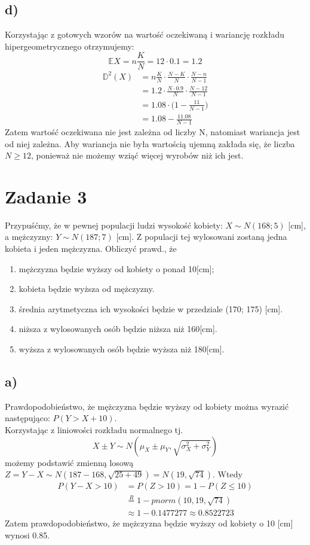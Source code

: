 \documentclass{article}
\begin{document}
\subsection*{d)}
Korzystając z gotowych wzorów na wartość oczekiwaną i wariancję rozkładu hipergeometrycznego otrzymujemy:
\[
\mathbb{E}X = n\frac{K}{N} = 12\cdot0.1 = 1.2
\]
\begin{align*}
\mathbb{D}^2(X) & = n\frac{K}{N} \cdot \frac{N-K}{N} \cdot \frac{N-n}{N-1} \\
& = 1.2\cdot \frac{N\cdot0.9}{N} \cdot \frac{N-12}{N-1} \\
& = 1.08 \cdot \Big( 1 -\frac{11}{N-1}\Big) \\
& = 1.08 -\frac{11.08}{N-1}
\end{align*}
Zatem wartość oczekiwana nie jest zależna od liczby N, natomiast wariancja jest od niej zależna. Aby wariancja nie była wartością ujemną zakłada się, że liczba $N\geq12$, ponieważ nie możemy wziąć więcej wyrobów niż ich jest.

\newpage
\section{Zadanie 3}
Przypuśćmy, że w pewnej populacji ludzi wysokość kobiety: $X\sim N(168;5)$ [cm], a mężczyzny: $Y\sim N(187;7)$ [cm]. Z populacji tej wylosowani zostaną jedna kobieta i jeden mężczyzna. Obliczyć prawd., że
\begin{enumerate}[label=\alph*)]
\item mężczyzna będzie wyższy od kobiety o ponad 10[cm];
\item kobieta będzie wyższa od mężczyzny.
\item średnia arytmetyczna ich wysokości będzie w przedziale (170; 175) [cm].
\item niższa z wylosowanych osób będzie niższa niż 160[cm].
\item wyższa z wylosowanych osób będzie wyższa niż 180[cm].
\end{enumerate}

\subsection*{a)}
Prawdopodobieństwo, że mężczyzna będzie wyższy od kobiety można wyrazić następująco: $P(Y>X+10)$. \\
Korzystając z liniowości rozkładu normalnego tj. 
$$X\pm Y \sim N(\mu_X \pm \mu_Y, \sqrt{\sigma_X^2 + \sigma_Y^2})$$
możemy podstawić zmienną losową $Z = Y-X \sim N(187-168,\sqrt{25+49}) = N(19,\sqrt{74})$. Wtedy
\begin{align*}
P(Y-X>10) & = P(Z>10) = 1 - P(Z\leq10) \\
& \overset{R}{=} 1 - pnorm(10,19,\sqrt{74}) \\
&\approx 1 - 0.1477277 \approx 0.8522723
\end{align*}
Zatem prawdopodobieństwo, że mężczyzna będzie wyższy od kobiety o 10 [cm] wynosi 0.85.
\end{document}
